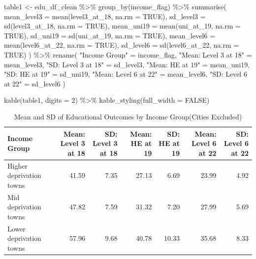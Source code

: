\documentclass[11pt,en]{../resources/elegantpaper}
\newenvironment{Shaded}{\begin{snugshade}}{\end{snugshade}}
\newcommand{\AttributeTok}[1]{\textcolor[rgb]{0.77,0.63,0.00}{#1}}
\newcommand{\ConstantTok}[1]{\textcolor[rgb]{0.00,0.00,0.00}{#1}}
\newcommand{\DecValTok}[1]{\textcolor[rgb]{0.00,0.00,0.81}{#1}}
\newcommand{\FunctionTok}[1]{\textcolor[rgb]{0.00,0.00,0.81}{#1}}
\newcommand{\NormalTok}[1]{#1}
\newcommand{\OtherTok}[1]{\textcolor[rgb]{0.50,0.00,0.50}{#1}}
\newcommand{\SpecialCharTok}[1]{\textcolor[rgb]{0.00,0.00,0.00}{#1}}
\newcommand{\StringTok}[1]{\textcolor[rgb]{0.31,0.60,0.02}{#1}}
\begin{document}
\begin{Shaded}
\begin{Highlighting}[]
\NormalTok{table1 }\OtherTok{\textless{}{-}}\NormalTok{ edu\_df\_clean }\SpecialCharTok{\%\textgreater{}\%}
  \FunctionTok{group\_by}\NormalTok{(income\_flag) }\SpecialCharTok{\%\textgreater{}\%}
  \FunctionTok{summarise}\NormalTok{(}
    \AttributeTok{mean\_level3 =} \FunctionTok{mean}\NormalTok{(level3\_at\_18, }\AttributeTok{na.rm =} \ConstantTok{TRUE}\NormalTok{),}
    \AttributeTok{sd\_level3 =} \FunctionTok{sd}\NormalTok{(level3\_at\_18, }\AttributeTok{na.rm =} \ConstantTok{TRUE}\NormalTok{),}
    \AttributeTok{mean\_uni19 =} \FunctionTok{mean}\NormalTok{(uni\_at\_19, }\AttributeTok{na.rm =} \ConstantTok{TRUE}\NormalTok{),}
    \AttributeTok{sd\_uni19 =} \FunctionTok{sd}\NormalTok{(uni\_at\_19, }\AttributeTok{na.rm =} \ConstantTok{TRUE}\NormalTok{),}
    \AttributeTok{mean\_level6 =} \FunctionTok{mean}\NormalTok{(level6\_at\_22, }\AttributeTok{na.rm =} \ConstantTok{TRUE}\NormalTok{),}
    \AttributeTok{sd\_level6 =} \FunctionTok{sd}\NormalTok{(level6\_at\_22, }\AttributeTok{na.rm =} \ConstantTok{TRUE}\NormalTok{)}
\NormalTok{  ) }\SpecialCharTok{\%\textgreater{}\%}
  \FunctionTok{rename}\NormalTok{(}
    \StringTok{"Income Group"} \OtherTok{=}\NormalTok{ income\_flag,}
    \StringTok{"Mean: Level 3 at 18"} \OtherTok{=}\NormalTok{ mean\_level3,}
    \StringTok{"SD: Level 3 at 18"} \OtherTok{=}\NormalTok{ sd\_level3,}
    \StringTok{"Mean: HE at 19"} \OtherTok{=}\NormalTok{ mean\_uni19,}
    \StringTok{"SD: HE at 19"} \OtherTok{=}\NormalTok{ sd\_uni19,}
    \StringTok{"Mean: Level 6 at 22"} \OtherTok{=}\NormalTok{ mean\_level6,}
    \StringTok{"SD: Level 6 at 22"} \OtherTok{=}\NormalTok{ sd\_level6}
\NormalTok{  )}

\FunctionTok{kable}\NormalTok{(table1, }\AttributeTok{digits =} \DecValTok{2}\NormalTok{) }\SpecialCharTok{\%\textgreater{}\%}
  \FunctionTok{kable\_styling}\NormalTok{(}\AttributeTok{full\_width =} \ConstantTok{FALSE}\NormalTok{)}
\end{Highlighting}
\end{Shaded}

\begin{longtable}[t]{lrrrrrr}

\caption{\label{tbl-edu_means_by_income}Mean and SD of Educational
Outcomes by Income Group(Cities Excluded)}

\tabularnewline

\toprule
Income Group & Mean: Level 3 at 18 & SD: Level 3 at 18 & Mean: HE at 19 & SD: HE at 19 & Mean: Level 6 at 22 & SD: Level 6 at 22\\
\midrule
Higher deprivation towns & 41.59 & 7.35 & 27.13 & 6.69 & 23.99 & 4.92\\
Mid deprivation towns & 47.82 & 7.59 & 31.32 & 7.20 & 27.99 & 5.69\\
Lower deprivation towns & 57.96 & 9.68 & 40.78 & 10.33 & 35.68 & 8.33\\
\bottomrule

\end{longtable}
\end{document}

